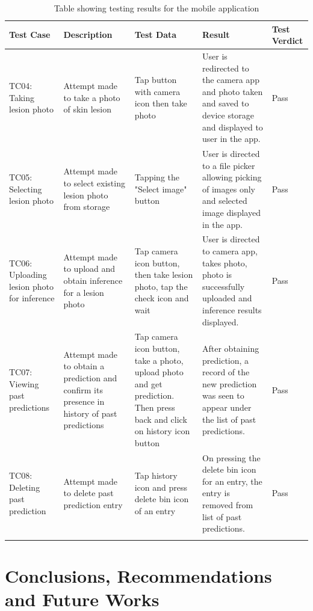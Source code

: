 \documentclass[12pt, a4paper]{article}
\begin{document}
\renewcommand{\arraystretch}{1.0}
\setlength{\tabcolsep}{6pt}
\begin{xltabular}{1\textwidth} {
        | >{\raggedright\arraybackslash}X
        | >{\raggedright\arraybackslash}X
        | >{\raggedright\arraybackslash}X
        | >{\raggedright\arraybackslash}X
        | >{\raggedright\arraybackslash}X
        |}
    \hline
    \textbf{Test Case} & \textbf{Description} & \textbf{Test Data} & \textbf{Result} & \textbf{Test Verdict}\\\hline
    TC04: Taking lesion photo & Attempt made to take a photo of skin lesion & Tap button with camera icon then take photo & User is redirected to the camera app and photo taken and saved to device storage and displayed to user in the app. & Pass\\\hline
    TC05: Selecting lesion photo & Attempt made to select existing lesion photo from storage & Tapping the "Select image" button & User is directed to a file picker allowing picking of images only and selected image displayed in the app. & Pass\\\hline
    TC06: Uploading lesion photo for inference & Attempt made to upload and obtain inference for a lesion photo & Tap camera icon button, then take lesion photo, tap the check icon and wait & User is directed to camera app, takes photo, photo is successfully uploaded and inference results displayed. & Pass\\\hline
    TC07: Viewing past predictions & Attempt made to obtain a prediction and confirm its presence in history of past predictions & Tap camera icon button, take a photo, upload photo and get prediction. Then press back and click on history icon button & After obtaining prediction, a record of the new prediction was seen to appear under the list of past predictions. & Pass\\\hline
    TC08: Deleting past prediction & Attempt made to delete past prediction entry & Tap history icon and press delete bin icon of an entry & On pressing the delete bin icon for an entry, the entry is removed from list of past predictions. & Pass\\\hline

    \caption{Table showing testing results for the mobile application}
    \label{tab:testing-results-app}
\end{xltabular}

\clearpage
\section{Conclusions, Recommendations and Future Works}
\end{document}
